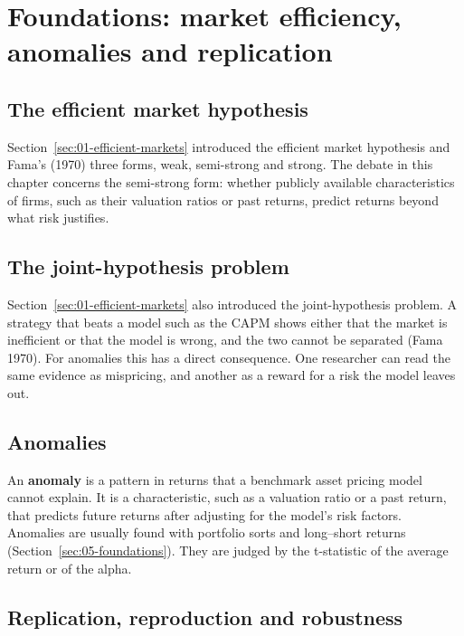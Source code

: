 \section{Foundations: market efficiency, anomalies and replication}
\label{sec:19-foundations}

\subsection{The efficient market hypothesis}

Section~\ref{sec:01-efficient-markets} introduced the efficient market hypothesis and Fama's (1970) three forms, weak, semi-strong and strong. The debate in this chapter concerns the semi-strong form: whether publicly available characteristics of firms, such as their valuation ratios or past returns, predict returns beyond what risk justifies.

\subsection{The joint-hypothesis problem}

Section~\ref{sec:01-efficient-markets} also introduced the joint-hypothesis problem. A strategy that beats a model such as the CAPM shows either that the market is inefficient or that the model is wrong, and the two cannot be separated (Fama 1970). For anomalies this has a direct consequence. One researcher can read the same evidence as mispricing, and another as a reward for a risk the model leaves out.

\subsection{Anomalies}

An \textbf{anomaly} is a pattern in returns that a benchmark asset pricing model cannot explain. It is a characteristic, such as a valuation ratio or a past return, that predicts future returns after adjusting for the model's risk factors. Anomalies are usually found with portfolio sorts and long--short returns (Section~\ref{sec:05-foundations}). They are judged by the t-statistic of the average return or of the alpha.

\subsection{Replication, reproduction and robustness}

